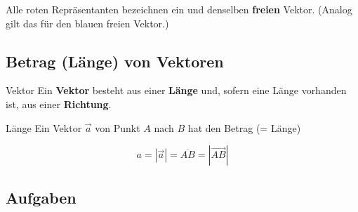 Alle {\color{red} roten} Repräsentanten bezeichnen ein und denselben
\textbf{freien} Vektor. (Analog gilt das für den {\color{blue} blauen} freien Vektor.)

\newpage


\subsection{Betrag (Länge) von Vektoren}




\begin{definition}{Vektor}{}
  Ein \textbf{Vektor} besteht aus einer \textbf{Länge} und, sofern eine Länge
  vorhanden ist, aus einer \textbf{Richtung}.
\end{definition}


    \begin{definition}{Länge}{}
      Ein Vektor $\vec{a}$ von Punkt $A$ nach $B$ hat den Betrag (= Länge)

      $$a = |\vec{a}| = \overline{AB} = \left|\overrightarrow{AB}\right|$$
    \end{definition}


\subsection*{Aufgaben}\
\newpage
